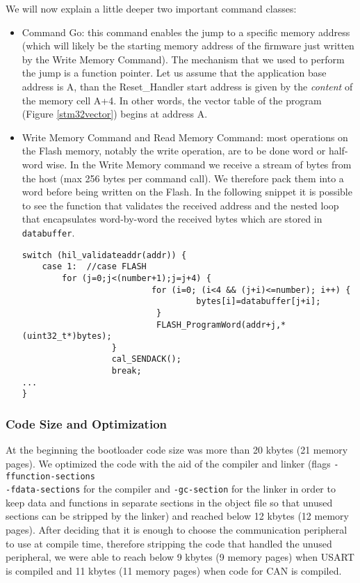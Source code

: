 \documentclass[11pt]{article} %
\begin{document}
We will now explain a little deeper two important command classes:
\begin{itemize}
\item Command Go: this command enables the jump to a specific memory address (which will likely be the starting memory address of the firmware just written by the Write Memory Command). The mechanism that we used to perform the jump is a function pointer. Let us assume that the application base address is A, than the Reset\_Handler start address is given by the {\itshape content} of the memory cell A+4. In other words, the vector table of the program (Figure \ref{stm32vector}) begins at address A.
\item Write Memory Command and Read Memory Command: most operations on the Flash memory, notably the write operation, are to be done word or half-word wise. In the Write Memory command we receive a stream of bytes from the host (max 256 bytes per command call). We therefore pack them into a word before being written on the Flash. In the following snippet it is possible to see the function that validates the received address and the nested loop that encapsulates word-by-word the received bytes which are stored in \texttt{databuffer}.
\begin{table}[h]
\begin{verbatim}
switch (hil_validateaddr(addr)) {
    case 1:  //case FLASH
        for (j=0;j<(number+1);j=j+4) {
                          for (i=0; (i<4 && (j+i)<=number); i++) {
                                   bytes[i]=databuffer[j+i];
                           }
                           FLASH_ProgramWord(addr+j,*(uint32_t*)bytes);
                  }
                  cal_SENDACK();
                  break;
...
}
\end{verbatim}
\end{table}
\end{itemize}

\subsubsection{Code Size and Optimization}
At the beginning the bootloader code size was more than 20 kbytes (21 memory pages). We optimized the code with the aid of the compiler and linker (flags \texttt{-ffunction-sections} \\ \texttt{-fdata-sections} for the compiler and \texttt{-gc-section} for the linker in order to keep data and functions in separate sections in the object file so that unused sections can be stripped by the linker) and reached below 12 kbytes (12 memory pages). After deciding that it is enough to choose the communication peripheral to use at compile time, therefore stripping the code that handled the unused peripheral, we were able to reach below 9 kbytes (9 memory pages) when USART is compiled and 11 kbytes (11 memory pages) when code for CAN is compiled.
\end{document}
